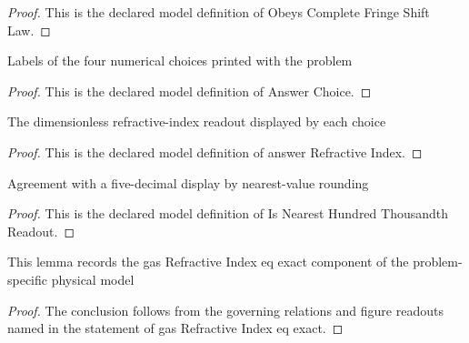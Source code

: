 \begin{proof}
  This is the declared model definition of Obeys Complete Fringe Shift Law.
\end{proof}
\begin{definition}
  \label{def:physics:phyx-mini-0250:phyxminiproblems-problemphyxmini0250-answerchoice}
  Labels of the four numerical choices printed with the problem
\end{definition}
\begin{proof}
  This is the declared model definition of Answer Choice.
\end{proof}
\begin{definition}
  \label{def:physics:phyx-mini-0250:phyxminiproblems-problemphyxmini0250-answerrefractiveindex}
  The dimensionless refractive-index readout displayed by each choice
\end{definition}
\begin{proof}
  This is the declared model definition of answer Refractive Index.
\end{proof}
\begin{definition}
  \label{def:physics:phyx-mini-0250:phyxminiproblems-problemphyxmini0250-isnearesthundredthousandthreadout}
  Agreement with a five-decimal display by nearest-value rounding
\end{definition}
\begin{proof}
  This is the declared model definition of Is Nearest Hundred Thousandth Readout.
\end{proof}
\begin{lemma}
  \label{lem:physics:phyx-mini-0250:phyxminiproblems-problemphyxmini0250-gasrefractiveindex-eq-exact}
  This lemma records the gas Refractive Index eq exact component of the problem-specific physical model
\end{lemma}
\begin{proof}
  The conclusion follows from the governing relations and figure readouts named in the statement of gas Refractive Index eq exact.
\end{proof}
